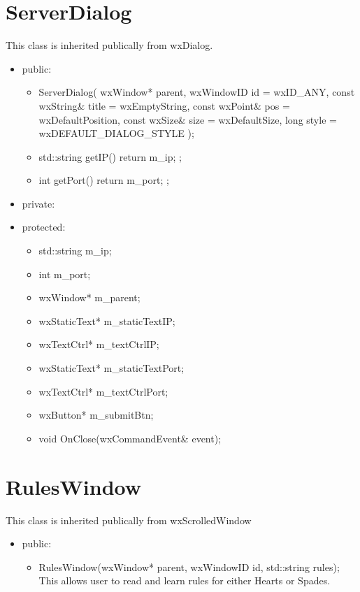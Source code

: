 \documentclass[]{scrartcl}
\begin{document}
 \section{ServerDialog }
 	This class is inherited publically from wxDialog.
 	\begin{itemize}
 	\item public:

 	\begin{itemize}
 		\item ServerDialog( wxWindow* parent, wxWindowID id = wxID\_ANY, const wxString\& title = wxEmptyString, const wxPoint\& pos = wxDefaultPosition, const wxSize\& size = wxDefaultSize, long style = wxDEFAULT\_DIALOG\_STYLE );

 		\item std::string getIP() { return m\_ip; };

 		\item int getPort() { return m\_port; };
 	\end{itemize}

 	\item private:
 	\item protected:
 		\begin{itemize}
 			\item std::string m\_ip;
 			\item	int m\_port;
 			\item	wxWindow* m\_parent;
 			\item	wxStaticText* m\_staticTextIP;
 			\item	wxTextCtrl* m\_textCtrlIP;
 			\item	wxStaticText* m\_staticTextPort;
 			\item	wxTextCtrl* m\_textCtrlPort;
 			\item	wxButton* m\_submitBtn;
 			\item	void OnClose(wxCommandEvent\& event);
 		\end{itemize}
 	\end{itemize}

 \section{RulesWindow }
 	This class is inherited  publically from wxScrolledWindow

 	\begin{itemize}
 		\item 	public:
 		\begin{itemize}
 			\item RulesWindow(wxWindow* parent, wxWindowID id, std::string rules);
 				\\This allows user to read and learn rules for either Hearts or Spades.
 		\end{itemize}
 	\end{itemize}
\end{document}
